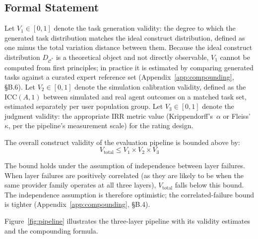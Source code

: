 \documentclass[preprint,12pt]{elsarticle}
\newcommand{\vtot}{V_{\text{total}}}
\newcommand{\cone}{V_1}
\newcommand{\ctwo}{V_2}
\newcommand{\cthree}{V_3}
\newcommand{\ka}{Krippendorff's~$\alpha$}
\newcommand{\fk}{Fleiss'~$\kappa$}
\newcommand{\icc}{\text{ICC}(A,1)}
\begin{document}
\subsection{Formal Statement}
\label{sec:formal}

Let $\cone \in [0,1]$ denote the task generation validity: the degree to which the
generated task distribution matches the ideal construct distribution, defined as one
minus the total variation distance between them. Because the ideal construct
distribution $D_{\mathcal{C}^*}$ is a theoretical object and not directly observable,
$\cone$ cannot be computed from first principles; in practice it is estimated by
comparing generated tasks against a curated expert reference set
(Appendix~\ref{app:compounding}, \S{}B.6). Let $\ctwo \in [0,1]$ denote the
simulation calibration validity, defined as the $\icc$ between simulated and real
agent outcomes on a matched task set, estimated separately per user population group.
Let $\cthree \in [0,1]$ denote the judgment validity: the appropriate IRR metric
value (\ka{} or \fk, per the pipeline's measurement scale) for the rating design.

The overall construct validity of the evaluation pipeline is bounded above by:
\begin{equation}
  \vtot \leq \cone \times \ctwo \times \cthree
  \label{eq:bound}
\end{equation}

The bound holds under the assumption of independence between layer failures. When
layer failures are positively correlated (as they are likely to be when the same
provider family operates at all three layers), $\vtot$ falls below this bound. The
independence assumption is therefore optimistic; the correlated-failure bound is
tighter (Appendix~\ref{app:compounding}, \S{}B.4).

Figure~\ref{fig:pipeline} illustrates the three-layer pipeline with its validity
estimates and the compounding formula.
\end{document}
